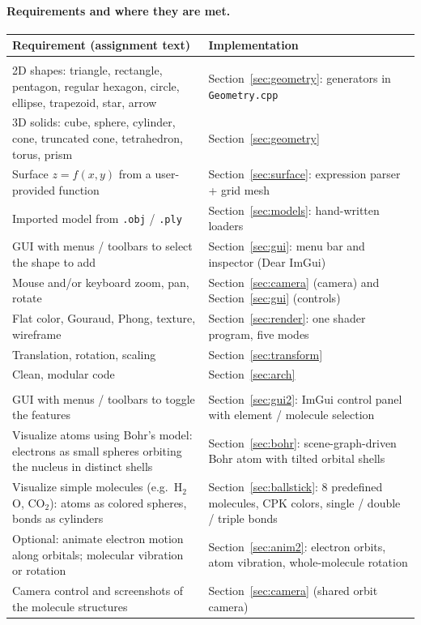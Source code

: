\documentclass[a4paper, 11pt]{article}
\newcommand{\code}[1]{\texttt{#1}}
\begin{document}
\paragraph{Requirements and where they are met.}
\begin{center}
\small
\begin{tabularx}{\textwidth}{@{}>{\raggedright\arraybackslash}p{5.9cm}X@{}}
\toprule
\textbf{Requirement (assignment text)} & \textbf{Implementation}\\
\midrule
\multicolumn{2}{@{}l}{\textit{Part 1}}\\
2D shapes: triangle, rectangle, pentagon, regular hexagon, circle, ellipse, trapezoid, star, arrow
  & Section~\ref{sec:geometry}: generators in \code{Geometry.cpp}\\
3D solids: cube, sphere, cylinder, cone, truncated cone, tetrahedron, torus, prism
  & Section~\ref{sec:geometry}\\
Surface $z=f(x,y)$ from a user-provided function
  & Section~\ref{sec:surface}: expression parser + grid mesh\\
Imported model from \code{.obj} / \code{.ply}
  & Section~\ref{sec:models}: hand-written loaders\\
GUI with menus / toolbars to select the shape to add
  & Section~\ref{sec:gui}: menu bar and inspector (Dear ImGui)\\
Mouse and/or keyboard zoom, pan, rotate
  & Section~\ref{sec:camera} (camera) and Section~\ref{sec:gui} (controls)\\
Flat color, Gouraud, Phong, texture, wireframe
  & Section~\ref{sec:render}: one shader program, five modes\\
Translation, rotation, scaling
  & Section~\ref{sec:transform}\\
Clean, modular code
  & Section~\ref{sec:arch}\\
\midrule
\multicolumn{2}{@{}l}{\textit{Part 2}}\\
GUI with menus / toolbars to toggle the features
  & Section~\ref{sec:gui2}: ImGui control panel with element / molecule selection\\
Visualize atoms using Bohr's model: electrons as small spheres orbiting the nucleus in distinct shells
  & Section~\ref{sec:bohr}: scene-graph-driven Bohr atom with tilted orbital shells\\
Visualize simple molecules (e.g.\ H$_2$O, CO$_2$): atoms as colored spheres, bonds as cylinders
  & Section~\ref{sec:ballstick}: 8 predefined molecules, CPK colors, single / double / triple bonds\\
Optional: animate electron motion along orbitals; molecular vibration or rotation
  & Section~\ref{sec:anim2}: electron orbits, atom vibration, whole-molecule rotation\\
Camera control and screenshots of the molecule structures
  & Section~\ref{sec:camera} (shared orbit camera)\\
\bottomrule
\end{tabularx}
\end{center}
\end{document}
